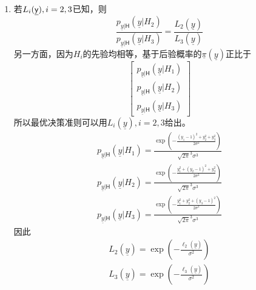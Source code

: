 \documentclass[a4paper]{article}
\begin{document}
\begin{enumerate}[label=\thehwcnt.\arabic*.]
\begin{enumerate}[label=(\alph*)]
\begin{enumerate}[label=\roman*.]
    \end{enumerate}
    
  \item
    若$L_i(\underline{\mathsf{y}}),i=2,3$已知，则
    \[
       \frac{p_{\underline{y}|\mathsf{H}}(\underline{y}|H_2)}
       {p_{\underline{y}|\mathsf{H}}(\underline{y}|H_3)}=\frac{L_2(\underline{y})}
       {L_3(\underline{y})}
    \]
    另一方面，因为$H_i$的先验均相等，基于后验概率的$\underline{\pi}(\underline{y})$正比于
    \[
    \begin{bmatrix}
    p_{\underline{y}|\mathsf{H}}(\underline{y}|H_1)\\
    p_{\underline{y}|\mathsf{H}}(\underline{y}|H_2)\\
    p_{\underline{y}|\mathsf{H}}(\underline{y}|H_3)
    \end{bmatrix}
    \]
    所以最优决策准则可以用$L_i(\underline{y}),i=2,3$给出。
    \begin{align*}
    p_{\underline{y}|\mathsf{H}}(\underline{y}|H_1)=\frac{\exp(-\frac{(y_1-1)^2+y_2^2+y_3^2}{2\sigma^2})}{\sqrt{2\pi}^3\sigma^3}\\    
    p_{\underline{y}|\mathsf{H}}(\underline{y}|H_2)=\frac{\exp(-\frac{y_1^2+(y_2-1)^2+y_3^2}{2\sigma^2})}{\sqrt{2\pi}^3\sigma^3}\\    
    p_{\underline{y}|\mathsf{H}}(\underline{y}|H_3)=\frac{\exp(-\frac{y_1^2+y_2^2+(y_3-1)^2}{2\sigma^2})}{\sqrt{2\pi}^3\sigma^3}
    \end{align*}
    因此
    \begin{align*}
    L_2(\underline{y})=\exp(-\frac{\ell_2(\underline{y})}{\sigma^2})\\
    L_3(\underline{y})=\exp(-\frac{\ell_3(\underline{y})}{\sigma^2})
    \end{align*}
    

\end{enumerate}
\end{enumerate}
\end{document}

